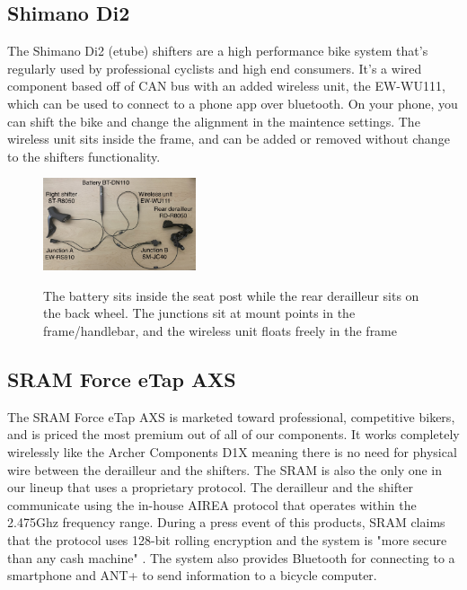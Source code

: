 \documentclass[letterpaper,twocolumn,10pt]{article}
\begin{document}
\subsection{Shimano Di2}

The Shimano Di2 (etube) shifters are a high performance bike system that's regularly used by professional cyclists and high end consumers. It's a wired component based off of CAN bus with an added wireless unit, the EW-WU111, which can be used to connect to a phone app over bluetooth. On your phone, you can shift the bike and change the alignment in the maintence settings. The wireless unit sits inside the frame, and can be added or removed without change to the shifters functionality.

\begin{figure}[ht]
  \begin{center}
    \centering
    \includegraphics[width=0.4\textwidth]{images/IMG_5264_Di2.jpg}
    \label{fig:Di2Setup}
  \end{center}
  \caption{The battery sits inside the seat post while the rear derailleur sits on the back wheel. The junctions sit at mount points in the frame/handlebar, and the wireless unit floats freely in the frame}
\end{figure}


\subsection{SRAM Force eTap AXS}
The SRAM Force eTap AXS \cite{etap} is marketed toward professional, competitive bikers, and is priced the most premium out of all of our components. It works completely wirelessly like the Archer Components D1X meaning there is no need for physical wire between the derailleur and the shifters. The SRAM is also the only one in our lineup that uses a proprietary protocol. The derailleur and the shifter communicate using the in-house AIREA protocol that operates within the 2.475Ghz frequency range. During a press event of this products, SRAM claims that  the protocol uses 128-bit rolling encryption and the system is "more secure than any cash machine" \cite{phillips2015SRAM}. The system also provides Bluetooth for connecting to a smartphone and ANT+ to send information to a bicycle computer.
\end{document}
